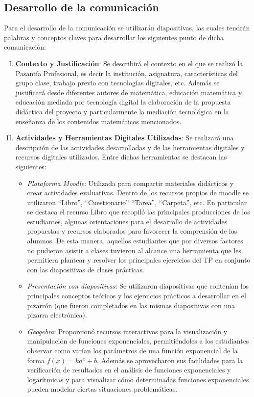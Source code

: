 \subsection{Desarrollo de la comunicación}

Para el desarrollo de la comunicación se utilizarán diapositivas, las cuales tendrán palabras y conceptos claves para desarrollar los siguientes punto de dicha comunicación:

\begin{enumerate}[I.]
	\item \textbf{Contexto y Justificación}: Se describirá el contexto en el que se realizó la Pasantía Profesional, es decir la institución, asignatura, características del grupo clase, trabajo previo con tecnologías digitales, etc. Además se justificará desde diferentes autores de matemática, educación matemática y educación mediada por tecnología digital la elaboración de la propuesta didáctica del proyecto y particularmente la mediación tecnológica en la enseñanza de los contenidos matemáticos mencionados.
	\item \textbf{Actividades y Herramientas Digitales Utilizadas}: Se realizará una descripción de las actividades desarrolladas y de las herramientas digitales y recursos digitales utilizados. Entre dichas herramientas se destacan las siguientes:
	\begin{itemize}
		\item \textit{Plataforma Moodle}: Utilizada para compartir materiales didácticos y crear actividades evaluativas. Dentro de los recursos propios de moodle se utilizaron “Libro”, “Cuestionario” “Tarea”, “Carpeta”, etc. En particular se destaca el recurso Libro que recopiló las principales producciones de los estudiantes, algunas orientaciones para el desarrollo de actividades propuestas y recursos elaborados para favorecer la comprensión de los alumnos. De esta manera, aquellos estudiantes que por diversos factores no pudieron asistir a clases tuvieron al alcance una herramienta que les permitiera plantear y resolver los principales ejercicios del TP en conjunto con las diapositivas de clases prácticas.
		\item \textit{Presentación con diapositivas}: Se utilizaron diapositivas que contenían los principales conceptos teóricos y los ejercicios prácticos a desarrollar en el pizarrón (que fueron completados en las mismas diapositivas con una pizarra electrónica).
		\item \textit{Geogebra}: Proporcionó recursos interactivos para la visualización y manipulación de funciones exponenciales, permitiéndoles a los estudiantes observar como varían los parámetros de una función exponencial de la forma $f(x) = k a^x + b$. Además se aprovecharon sus facilidades para la verificación de resultados en el análisis de funciones exponenciales y logarítmicas y para visualizar cómo determinadas funciones exponenciales pueden modelar ciertas situaciones problemáticas.

\end{itemize}
\end{enumerate}
